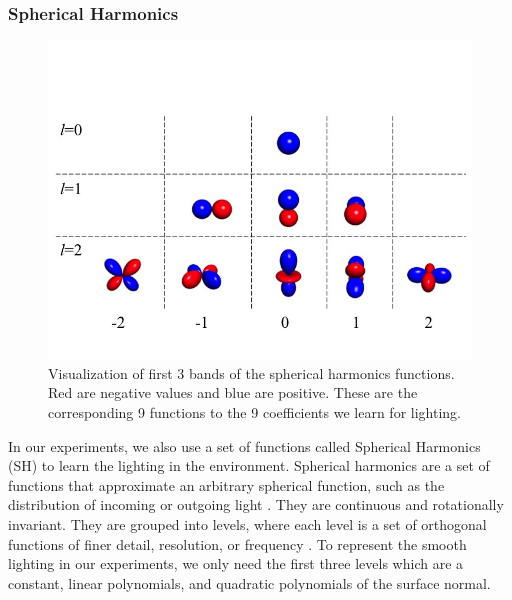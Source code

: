 \documentclass[10pt,twocolumn,letterpaper]{article}
\begin{document}
\subsubsection{Spherical Harmonics}
\begin{figure}[h!]
\centering
\includegraphics[width=1.0\columnwidth]{./assets/SH_Fig.jpg}
\caption{Visualization of first 3 bands of the spherical harmonics functions. Red are negative values and blue are positive. These are the corresponding 9 functions to the 9 coefficients we learn for lighting.}
\label{fig:SHBands01}
\end{figure}
In our experiments, we also use a set of functions called Spherical Harmonics (SH) to learn the lighting in the environment. Spherical harmonics are a set of functions that approximate an arbitrary spherical function, such as the distribution of incoming or outgoing light \cite{Ramamoorthi:2001:ERI:383259.383317}.  They are continuous and rotationally invariant. They are grouped into levels, where each level is a set of orthogonal functions of finer detail, resolution, or frequency \cite{Shreiner:2013:OPG:2544032}.  To represent the smooth lighting in our experiments, we only need the first three levels which are a constant, linear polynomials, and quadratic polynomials of the surface normal.\\
\end{document}
